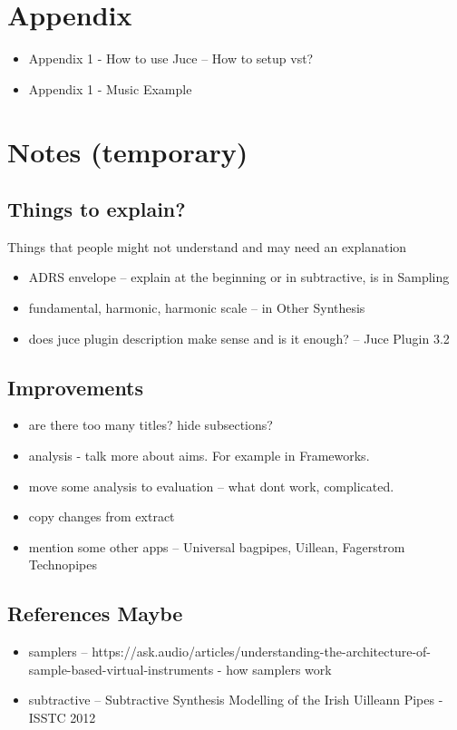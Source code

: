 \documentclass[12pt]{article}
\begin{document}
	
\section{Appendix}
	\begin{itemize}
		\item Appendix 1 - How to use Juce -- How to setup vst?
		\item Appendix 1 - Music Example
	\end{itemize}


\section{Notes (temporary)}
	\subsection{Things to explain? }
	Things that people might not understand and may need an explanation
	\begin{itemize}
		\item ADRS envelope -- explain at the beginning or in subtractive, is in Sampling
		\item fundamental, harmonic, harmonic scale -- in Other Synthesis
		\item does juce plugin description make sense and is it enough? -- Juce Plugin 3.2
	\end{itemize}

	\subsection{Improvements}
	\begin{itemize}
		\item are there too many titles? hide subsections?
		\item analysis - talk more about aims. For example in Frameworks.
		\item move some analysis to evaluation -- what dont work, complicated.
		\item copy changes from extract
		\item mention some other apps -- Universal bagpipes, Uillean, Fagerstrom Technopipes
	\end{itemize}

	\subsection{References Maybe}
	\begin{itemize}
		\item samplers -- https://ask.audio/articles/understanding-the-architecture-of-sample-based-virtual-instruments - how samplers work
		\item subtractive -- Subtractive Synthesis Modelling of the Irish Uilleann Pipes - ISSTC 2012
	\end{itemize}
	



	
\end{document}
